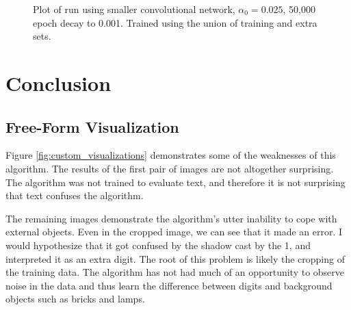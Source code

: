 \documentclass[12pt]{article}
\begin{document}
\begin{figure}
\centering
{}\hfill
{}\hfill
\caption{Plot of run using smaller convolutional network, $\alpha_0 = 0.025$, 50,000 epoch decay to 0.001. Trained using the union of training and extra sets.}
\label{fig:final_moredata}
\end{figure}

\section{Conclusion}
\subsection{Free-Form Visualization} \label{sssec:ffv}
Figure \ref{fig:custom_visualizations} demonstrates some of the weaknesses of this algorithm.
The results of the first pair of images are not altogether surprising.
The algorithm was not trained to evaluate text, and therefore it is not surprising that text confuses the algorithm.

The remaining images demonstrate the algorithm's utter inability to cope with external objects. 
Even in the cropped image, we can see that it made an error. 
I would hypothesize that it got confused by the shadow cast by the 1, and interpreted it as an extra digit.
The root of this problem is likely the cropping of the training data.
The algorithm has not had much of an opportunity to observe noise in the data and thus learn the difference between digits and background objects such as bricks and lamps.
\end{document}

